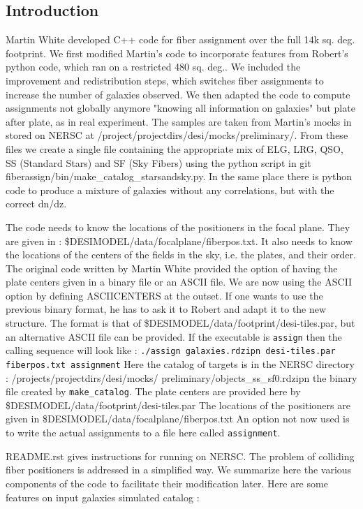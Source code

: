 \documentclass{extarticle}
\begin{document}
\begin{multicols}{2}
\section{Introduction}
Martin White developed C++ code for fiber assignment over the full 14k sq. deg. footprint.  We first modified Martin's code to incorporate features from Robert's python code, which ran on a restricted 480 sq. deg.. We included the improvement and redistribution steps, which switches fiber assignments to increase the number of galaxies observed. We then adapted the code to compute assignments not globally anymore "knowing all information on galaxies" but plate after plate, as in real experiment.
The samples are taken from Martin's mocks in stored on NERSC at /project/projectdirs/desi/mocks/preliminary/.  From these files we create a single file containing the appropriate mix of ELG, LRG, QSO, SS (Standard Stars) and SF (Sky Fibers) using the python script in git fiberassign/bin/make\_catalog\_starsandsky.py.  In the same place there is python code to produce a mixture of galaxies without any correlations, but with the correct dn/dz.  
  
  The code needs to know the locations of the positioners in the focal plane.  They are given in : \$DESIMODEL/data/focalplane/fiberpos.txt.
  It also needs to know the locations of the centers of the fields in the sky, i.e. the plates, and their order.  The original code written by Martin White provided the option of having the plate centers given in a binary file or an ASCII file.  We are now using the ASCII option by defining ASCIICENTERS at the outset.  If one wants to use the previous binary format, he has to ask it to Robert and adapt it to the new structure. The format is that of \$DESIMODEL/data/footprint/desi-tiles.par, but an alternative ASCII file can be provided. If the executable is {\tt assign} then the calling sequence will look like :
  {\tt./assign galaxies.rdzipn desi-tiles.par fiberpos.txt assignment}
 Here the catalog of targets is in the NERSC directory :
  /projects/projectdirs/desi/mocks/ preliminary/objects\_ss\_sf0.rdzipn the binary file created by {\tt make\_catalog}. The plate centers are provided here by \$DESIMODEL/data/footprint/desi-tiles.par The locations of the positioners are given in \$DESIMODEL/data/focalplane/fiberpos.txt An option not now used is to write the actual assignments to a file here called {\tt assignment}.
  
  README.rst gives instructions for running on NERSC. The problem of colliding fiber positioners is addressed in a simplified way. 
  We summarize here the various components of the code to facilitate their modification later.
Here are some features on input galaxies simulated catalog :


\end{multicols}
\end{document}

